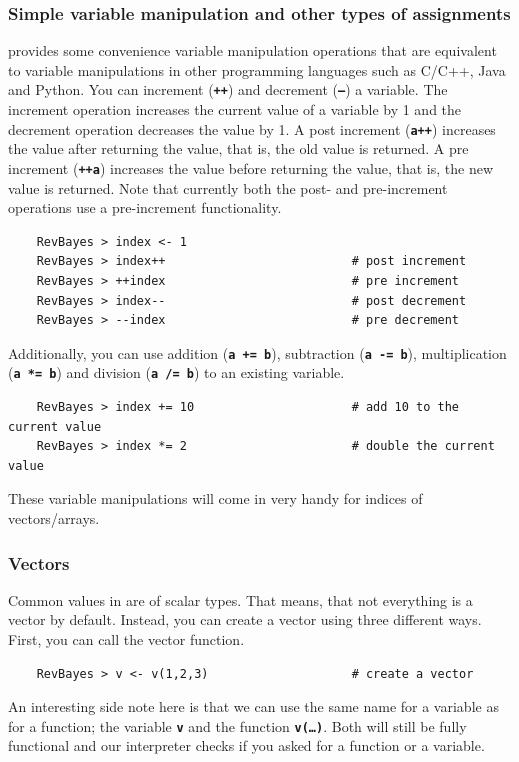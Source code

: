 \documentclass[11pt]{article}
\newcommand{\cl}[1]{{\texttt{\textbf{#1}}}}
\begin{document}
\subsubsection*{Simple variable manipulation and other types of assignments}
\Rev provides some convenience variable manipulation operations that are equivalent to variable manipulations in other programming languages such as C/C++, Java and Python.
You can increment (\cl{++}) and decrement (\cl{--}) a variable.
The increment operation increases the current value of a variable by 1 and the decrement operation decreases the value by 1.
A post increment (\cl{a++}) increases the value after returning the value, that is, the old value is returned.
A pre increment (\cl{++a}) increases the value before returning the value, that is, the new value is returned.
Note that currently both the post- and pre-increment operations use a pre-increment functionality.
{\tt \begin{snugshade*}
\begin{lstlisting}    
    RevBayes > index <- 1
    RevBayes > index++                          # post increment
    RevBayes > ++index                          # pre increment
    RevBayes > index--                          # post decrement
    RevBayes > --index                          # pre decrement
\end{lstlisting}
\end{snugshade*}}
Additionally, you can use addition (\cl{a += b}), subtraction (\cl{a -= b}), multiplication (\cl{a *= b}) and division (\cl{a /= b}) to an existing variable.
{\tt \begin{snugshade*}
\begin{lstlisting}    
    RevBayes > index += 10                      # add 10 to the current value
    RevBayes > index *= 2                       # double the current value
\end{lstlisting}
\end{snugshade*}}
These variable manipulations will come in very handy for indices of vectors/arrays.

\subsubsection*{Vectors}
Common values in \RevBayes are of scalar types.
That means, that not everything is a vector by default.
Instead, you can create a vector using three different ways.
First, you can call the vector function.
{\tt \begin{snugshade*}
\begin{lstlisting}    
    RevBayes > v <- v(1,2,3)                    # create a vector
\end{lstlisting}
\end{snugshade*}}
An interesting side note here is that we can use the same name for a variable as for a function; the variable \cl{v} and the function \cl{v(\ldots)}.
Both will still be fully functional and our interpreter checks if you asked for a function or a variable.
\end{document}
